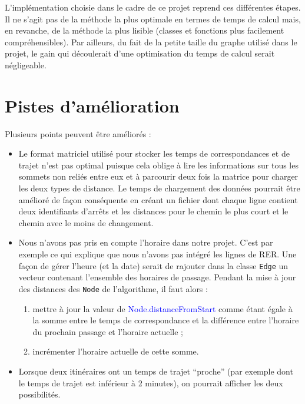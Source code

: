 \documentclass[,french]{article}
\begin{document}
L'implémentation choisie dans le cadre de ce projet reprend ces
différentes étapes. Il ne s'agit pas de la méthode la plus optimale en
termes de temps de calcul mais, en revanche, de la méthode la plus
lisible (classes et fonctions plus facilement compréhensibles). Par
ailleurs, du fait de la petite taille du graphe utilisé dans le projet,
le gain qui découlerait d'une optimisation du temps de calcul serait
négligeable.

\hypertarget{sec:amelioration}{%
\section{Pistes d'amélioration}\label{sec:amelioration}}

Plusieurs points peuvent être améliorés :

\begin{itemize}
\item
  Le format matriciel utilisé pour stocker les temps de correspondances
  et de trajet n'est pas optimal puisque cela oblige à lire les
  informations sur tous les sommets non reliés entre eux et à parcourir
  deux fois la matrice pour charger les deux types de distance. Le temps
  de chargement des données pourrait être amélioré de façon conséquente
  en créant un fichier dont chaque ligne contient deux identifiants
  d'arrêts et les distances pour le chemin le plus court et le chemin
  avec le moins de changement.
\item
  Nous n'avons pas pris en compte l'horaire dans notre projet. C'est par
  exemple ce qui explique que nous n'avons pas intégré les lignes de
  RER. Une façon de gérer l'heure (et la date) serait de rajouter dans
  la classe \texttt{Edge} un vecteur contenant l'ensemble des horaires
  de passage. Pendant la mise à jour des distances des \texttt{Node} de
  l'algorithme, il faut alors :

  \begin{enumerate}
  \def\labelenumi{\arabic{enumi}.}
  \item
    mettre à jour la valeur de \textcolor{blue}{Node.distanceFromStart}
    comme étant égale à la somme entre le temps de correspondance et la
    différence entre l'horaire du prochain passage et l'horaire actuelle
    ;
  \item
    incrémenter l'horaire actuelle de cette somme.
  \end{enumerate}
\item
  Lorsque deux itinéraires ont un temps de trajet ``proche'' (par
  exemple dont le temps de trajet est inférieur à 2 minutes), on
  pourrait afficher les deux possibilités.
\end{itemize}
\end{document}
